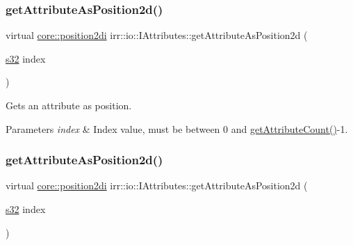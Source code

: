 \subsubsection{\texorpdfstring{get\+Attribute\+As\+Position2d()}{getAttributeAsPosition2d()}\hspace{0.1cm}{\footnotesize\ttfamily [3/4]}}
{\footnotesize\ttfamily virtual \hyperlink{namespaceirr_1_1core_ace0f1379db5f9f5660456ec57ab78202}{core\+::position2di} irr\+::io\+::\+I\+Attributes\+::get\+Attribute\+As\+Position2d (\begin{DoxyParamCaption}\item[{\hyperlink{namespaceirr_ac66849b7a6ed16e30ebede579f9b47c6}{s32}}]{index }\end{DoxyParamCaption})\hspace{0.3cm}{\ttfamily [pure virtual]}}



Gets an attribute as position. 


\begin{DoxyParams}{Parameters}
{\em index} & Index value, must be between 0 and \hyperlink{classirr_1_1io_1_1IAttributes_a796bdd9440ee7ba0b6742a90a82870b6}{get\+Attribute\+Count()}-\/1. \\
\hline
\end{DoxyParams}
\mbox{\label{classirr_1_1io_1_1IAttributes_a11afd9cf70fb04706e26ef15a3423d9a}} 
\subsubsection{\texorpdfstring{get\+Attribute\+As\+Position2d()}{getAttributeAsPosition2d()}\hspace{0.1cm}{\footnotesize\ttfamily [4/4]}}
{\footnotesize\ttfamily virtual \hyperlink{namespaceirr_1_1core_ace0f1379db5f9f5660456ec57ab78202}{core\+::position2di} irr\+::io\+::\+I\+Attributes\+::get\+Attribute\+As\+Position2d (\begin{DoxyParamCaption}\item[{\hyperlink{namespaceirr_ac66849b7a6ed16e30ebede579f9b47c6}{s32}}]{index }\end{DoxyParamCaption})\hspace{0.3cm}{\ttfamily [pure virtual]}}



